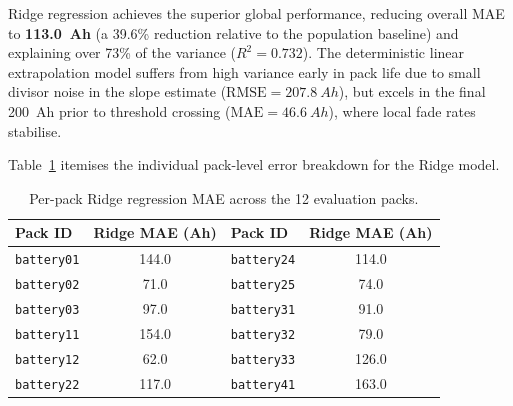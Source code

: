 \begin{table}[htbp]
  \centering
  \caption{Leave-One-Pack-Out (LOPO) RUL prediction performance over
  12 packs and 193 reference observations.}
  \label{tab:rul_performance}
\end{table}

Ridge regression achieves the superior global performance, reducing overall
MAE to \textbf{\SI{113.0}{Ah}} (a 39.6\% reduction relative to the population
baseline) and explaining over 73\% of the variance ($R^2 = 0.732$).
The deterministic linear extrapolation model suffers from high variance
early in pack life due to small divisor noise in the slope estimate
($\mathrm{RMSE} = \SI{207.8}{Ah}$), but excels in the final \SI{200}{Ah}
prior to threshold crossing ($\mathrm{MAE} = \SI{46.6}{Ah}$), where local
fade rates stabilise.

Table~\ref{tab:per_pack_mae} itemises the individual pack-level error
breakdown for the Ridge model.

\begin{table}[htbp]
  \centering
  \caption{Per-pack Ridge regression MAE across the 12 evaluation packs.}
  \label{tab:per_pack_mae}
  \begin{tabular}{lc|lc}
    \toprule
    \textbf{Pack ID} & \textbf{Ridge MAE (Ah)} & \textbf{Pack ID} & \textbf{Ridge MAE (Ah)} \\
    \midrule
    \texttt{battery01} & 144.0 & \texttt{battery24} & 114.0 \\
    \texttt{battery02} &  71.0 & \texttt{battery25} &  74.0 \\
    \texttt{battery03} &  97.0 & \texttt{battery31} &  91.0 \\
    \texttt{battery11} & 154.0 & \texttt{battery32} &  79.0 \\
    \texttt{battery12} &  62.0 & \texttt{battery33} & 126.0 \\
    \texttt{battery22} & 117.0 & \texttt{battery41} & 163.0 \\
    \bottomrule
  \end{tabular}
\end{table}

